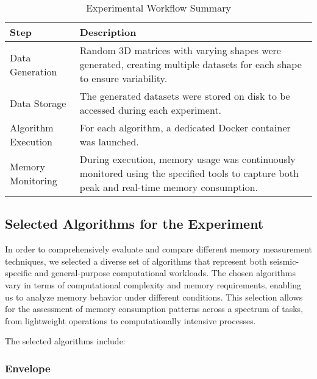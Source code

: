 \begin{table}[h]
    \centering
    \renewcommand{\arraystretch}{1.4}
    \setlength{\tabcolsep}{10pt}
    \begin{tabular}{|>{\raggedright\arraybackslash}p{3.5cm}|>{\raggedright\arraybackslash}p{7cm}|}
        \hline
        \textbf{Step}       & \textbf{Description}                                                                                                                       \\ \hline
        Data Generation     & Random 3D matrices with varying shapes were generated, creating multiple datasets for each shape to ensure variability.                    \\ \hline
        Data Storage        & The generated datasets were stored on disk to be accessed during each experiment.                                                          \\ \hline
        Algorithm Execution & For each algorithm, a dedicated Docker container was launched.                                                                             \\ \hline
        Memory Monitoring   & During execution, memory usage was continuously monitored using the specified tools to capture both peak and real-time memory consumption. \\ \hline
    \end{tabular}
    \caption{Experimental Workflow Summary}
    \label{tab:mmc-experimental-workflow}
\end{table}

\subsection{Selected Algorithms for the Experiment}
\label{subsec:mmc-selected-algorithms-for-the-experiment}

In order to comprehensively evaluate and compare different memory measurement techniques, we selected a diverse set of algorithms that represent both seismic-specific and general-purpose computational workloads.
The chosen algorithms vary in terms of computational complexity and memory requirements, enabling us to analyze memory behavior under different conditions.
This selection allows for the assessment of memory consumption patterns across a spectrum of tasks, from lightweight operations to computationally intensive processes.

The selected algorithms include:

\subsubsection{Envelope}

